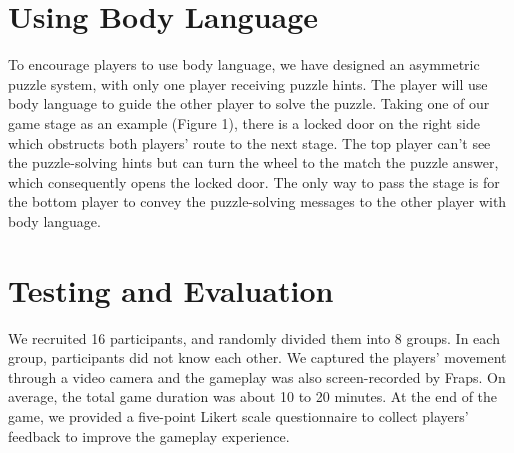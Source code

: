 \documentclass{chi-ext}
\begin{document}



\section{Using Body Language}

To encourage players to use body language, we have designed an asymmetric puzzle system, with only one player receiving puzzle hints. The player will use body language to guide the other player to solve the puzzle.
Taking one of our game stage as an example (Figure 1), there is a locked door on the right side which obstructs both players' route to the next stage. 
The top player can't see the puzzle-solving hints but can turn the wheel to the match the puzzle answer, which consequently opens the locked door.
The only way to pass the stage is for the bottom player to convey the puzzle-solving messages to the other player with body language. 


\section{Testing and Evaluation}

We recruited 16 participants, and randomly divided them into 8 groups. In each group, participants did not know each other. We captured the players' movement through a video camera and the gameplay was also screen-recorded by Fraps\cite{Fraps}.
On average, the total game duration was about 10 to 20 minutes. 
At the end of the game, we provided a five-point Likert scale questionnaire to 
collect players' feedback to improve the gameplay experience.
\end{document}
